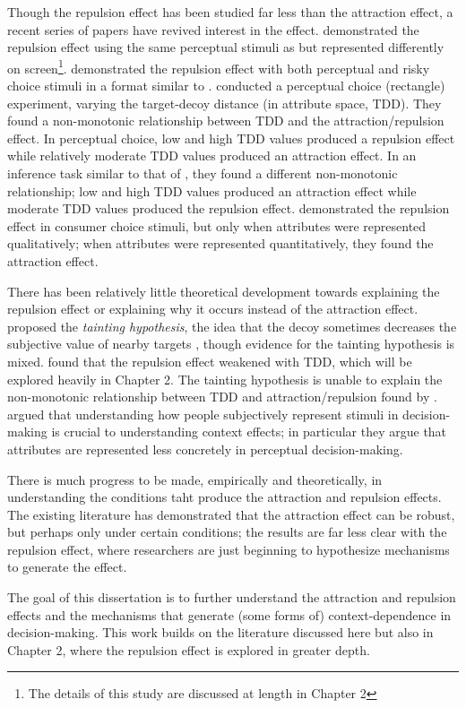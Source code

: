 Though the repulsion effect has been studied far less than the attraction effect, a recent series of papers have revived interest in the effect. \textcite{spektorWhenGoodLooks2018b} demonstrated the repulsion effect using the same perceptual stimuli as \textcite{trueblood2013not} but represented differently on screen\footnote{The details of this study are discussed at length in Chapter 2}. \textcite{spektorRepulsionEffectPreferential2022} demonstrated the repulsion effect with both perceptual and risky choice stimuli in a format similar to \textcite{spektorWhenGoodLooks2018b}. \textcite{liaoInfluenceDistanceDecoy2021} conducted a perceptual choice (rectangle) experiment, varying the target-decoy distance (in attribute space, TDD). They found a non-monotonic relationship between TDD and the attraction/repulsion effect. In perceptual choice, low and high TDD values produced a repulsion effect while relatively moderate TDD values produced an attraction effect. In an inference task similar to that of \textcite{truebloodMultialternativeContextEffects2012}, they found a different non-monotonic relationship; low and high TDD values produced an attraction effect while moderate TDD values produced the repulsion effect. \textcite{brendlPreferentialAttractionEffects2023} demonstrated the repulsion effect in consumer choice stimuli, but only when attributes were represented qualitatively; when attributes were represented quantitatively, they found the attraction effect.

There has been relatively little theoretical development towards explaining the repulsion effect or explaining why it occurs instead of the attraction effect. \textcite{frederick2008attraction} proposed the \textit{tainting hypothesis}, the idea that the decoy sometimes decreases the subjective value of nearby targets \parencite{simonson2014vices}, though evidence for the tainting hypothesis is mixed. \textcite{spektorWhenGoodLooks2018b} found that the repulsion effect weakened with TDD, which will be explored heavily in Chapter 2. The tainting hypothesis is unable to explain the non-monotonic relationship between TDD and attraction/repulsion found by \textcite{liaoInfluenceDistanceDecoy2021}. \textcite{spektorElusivenessContextEffects2021} argued that understanding how people subjectively represent stimuli in decision-making is crucial to understanding context effects; in particular they argue that attributes are represented less concretely in perceptual decision-making.

There is much progress to be made, empirically and theoretically, in understanding the conditions taht produce the attraction and repulsion effects. The existing literature has demonstrated that the attraction effect can be robust, but perhaps only under certain conditions; the results are far less clear with the repulsion effect, where researchers are just beginning to hypothesize mechanisms to generate the effect. 

The goal of this dissertation is to further understand the attraction and repulsion effects and the mechanisms that generate (some forms of) context-dependence in decision-making. This work builds on the literature discussed here but also in Chapter 2, where the repulsion effect is explored in greater depth. 
 

